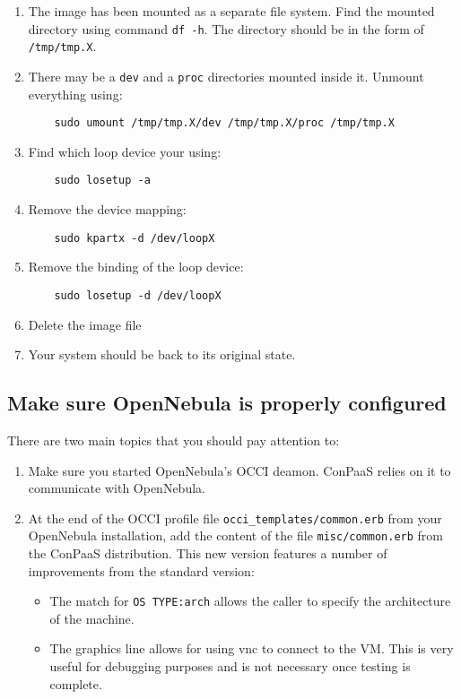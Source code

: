 \documentclass[10pt]{article}
\begin{document}
\begin{enumerate}
\item The image has been mounted as a separate file system. Find the
  mounted directory using command \verb+df -h+. The directory should
  be in the form of \verb+/tmp/tmp.X+.
  
\item There may be a \verb+dev+ and a \verb+proc+ directories mounted
  inside it. Unmount everything using:
  \begin{verbatim}
    sudo umount /tmp/tmp.X/dev /tmp/tmp.X/proc /tmp/tmp.X
  \end{verbatim}
  
\item Find which loop device your using:
  \begin{verbatim}
    sudo losetup -a
  \end{verbatim}
  
\item Remove the device mapping:
  \begin{verbatim}
    sudo kpartx -d /dev/loopX
  \end{verbatim}
  
\item Remove the binding of the loop device:
  \begin{verbatim}
    sudo losetup -d /dev/loopX
  \end{verbatim}

\item Delete the image file 

\item Your system should be back to its original state.
\end{enumerate}

\subsection{Make sure OpenNebula is properly configured}

There are two main topics that you should pay attention to:

\begin{enumerate}
\item Make sure you started OpenNebula's OCCI deamon. ConPaaS relies
  on it to communicate with OpenNebula.

\item At the end of the OCCI profile file \verb+occi_templates/common.erb+ 
  from your OpenNebula installation, add the content of the file
  \verb+misc/common.erb+ from the ConPaaS distribution. This new version 
  features a number of improvements from the standard version:
  \begin{itemize}
  \item The match for \verb+OS TYPE:arch+ allows the caller to specify
    the architecture of the machine.
  \item The graphics line allows for using vnc to connect to the VM.
    This is very useful for debugging purposes and is not necessary
    once testing is complete.
  \end{itemize}
\end{enumerate}
\end{document}
